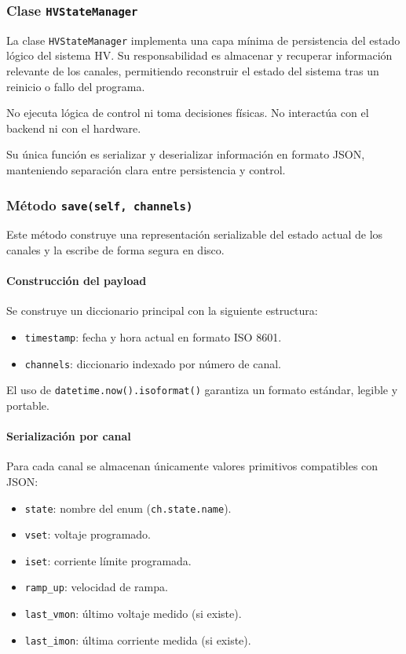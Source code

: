 \documentclass{article}
\begin{document}
\subsubsection{Clase \texttt{HVStateManager}}

La clase \texttt{HVStateManager} implementa una capa mínima de persistencia del
estado lógico del sistema HV. Su responsabilidad es almacenar y recuperar
información relevante de los canales, permitiendo reconstruir el estado del
sistema tras un reinicio o fallo del programa.

No ejecuta lógica de control ni toma decisiones físicas.  
No interactúa con el backend ni con el hardware.  

Su única función es serializar y deserializar información en formato JSON,
manteniendo separación clara entre persistencia y control.

\subsubsection{Método \texttt{save(self, channels)}}

Este método construye una representación serializable del estado actual
de los canales y la escribe de forma segura en disco.

\paragraph{Construcción del payload}

Se construye un diccionario principal con la siguiente estructura:

\begin{itemize}
    \item \texttt{timestamp}: fecha y hora actual en formato ISO 8601.
    \item \texttt{channels}: diccionario indexado por número de canal.
\end{itemize}

El uso de \texttt{datetime.now().isoformat()} garantiza un formato estándar,
legible y portable.

\paragraph{Serialización por canal}

Para cada canal se almacenan únicamente valores primitivos compatibles con JSON:

\begin{itemize}
    \item \texttt{state}: nombre del enum (\texttt{ch.state.name}).
    \item \texttt{vset}: voltaje programado.
    \item \texttt{iset}: corriente límite programada.
    \item \texttt{ramp\_up}: velocidad de rampa.
    \item \texttt{last\_vmon}: último voltaje medido (si existe).
    \item \texttt{last\_imon}: última corriente medida (si existe).
\end{itemize}
\end{document}
